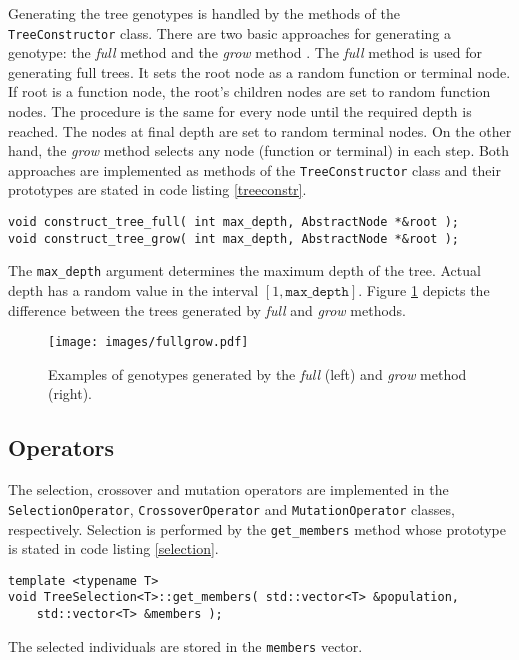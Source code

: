 Generating the tree genotypes is handled by the methods of the \texttt{TreeConstructor} class.
There are two basic approaches for generating a genotype: the \textit{full} method and the \textit{grow} method \cite{koza1992genetic}.
The \textit{full} method is used for generating full trees. 
It sets the root node as a random function or terminal node.
If root is a function node, the root's children nodes are set to random function nodes.
The procedure is the same for every node until the required depth is reached.
The nodes at final depth are set to random terminal nodes.
On the other hand, the \textit{grow} method selects any node (function or terminal) in each step.
Both approaches are implemented as methods of the \texttt{TreeConstructor} class and their prototypes are stated in code listing \ref{treeconstr}.
\begin{lstlisting}[frame=none, label={treeconstr}, caption={Functions for implementing the \textit{full} and \textit{grow} methods for creating a genotype.}, captionpos=b]
void construct_tree_full( int max_depth, AbstractNode *&root );
void construct_tree_grow( int max_depth, AbstractNode *&root );
\end{lstlisting}
The \texttt{max\_depth} argument determines the maximum depth of the tree.
Actual depth has a random value in the interval $[1, \texttt{max\_depth}]$.
Figure \ref{fullgrow} depicts the difference between the trees generated by \textit{full} and \textit{grow} methods.
\begin{figure}[ht]
    \centering
    \texttt{[image: images/fullgrow.pdf]}
    \caption{Examples of genotypes generated by the \textit{full} (left) and \textit{grow} method (right).}
    \label{fullgrow}
\end{figure}

\subsection{Operators}
The selection, crossover and mutation operators are implemented in the \texttt{SelectionOperator}, \texttt{CrossoverOperator} and \texttt{MutationOperator} classes, respectively.
Selection is performed by the \texttt{get\_members} method whose prototype is stated in code listing \ref{selection}.
\begin{lstlisting}[frame=none, label={selection}, caption={Prototype of the \texttt{get\_members} method which performs selection.}, captionpos=b]
template <typename T>
void TreeSelection<T>::get_members( std::vector<T> &population, 
	std::vector<T> &members );
\end{lstlisting}
The selected individuals are stored in the \texttt{members} vector.

